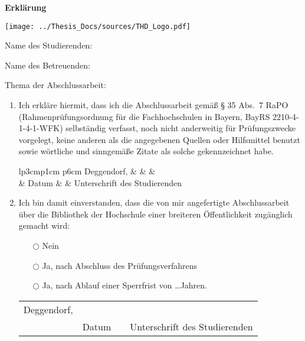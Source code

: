 \thispagestyle{empty}
\newcommand{\signature}[1]{%
\bigskip
\noindent
\begin{tabular*}{\linewidth}{lp{3cm}p{1cm} p{6cm}}
Deggendorf, & \dotfill & & \dotfill \\
& {\footnotesize Datum} & & {\centering \footnotesize #1}
\end{tabular*}
}

\begin{minipage}[b]{.5\linewidth}
	\Large\textbf{Erklärung}
\end{minipage}
\begin{minipage}[b]{.5\linewidth}
	\texttt{[image: ../Thesis\_Docs/sources/THD\_Logo.pdf]}
\end{minipage}

\bigskip

Name des Studierenden: \quad \student

\bigskip
Name des Betreuenden: \quad \supervisor

\vspace{.7cm}
Thema der Abschlussarbeit:

\vspace{.5em}
{\def\\{\relax\ifhmode\unskip\fi\space\ignorespaces}
\thesistitleDE
}\dotfill

\vspace{.5em}
\dotfill

\vspace{.5em}
\dotfill

\vspace{.5em}
\dotfill

\begin{enumerate}
	\item Ich erkläre hiermit, dass ich die Abschlussarbeit gemäß § 35 Abs.~7 RaPO (Rahmen\-prüf\-ungs\-ordnung für die Fachhochschulen in Bayern, BayRS 2210-4-1-4-1-WFK)  selbständig  verfasst,  noch  nicht  anderweitig  für Prüfungszwecke  vorgelegt,  keine  anderen  als  die  angegebenen  Quellen  oder Hilfsmittel  benutzt  sowie  wörtliche  und  sinngemäße  Zitate  als  solche gekenn\-zeichnet habe.

		\signature{Unterschrift des Studierenden}

	\item  Ich  bin  damit  einverstanden, dass die von  mir angefertigte  Abschlussarbeit über die Bibliothek der Hochschule einer breiteren Öffentlichkeit zugänglich gemacht wird:
		\begin{itemize}
			\item[$\bigcirc$] Nein
			\item[$\bigcirc$] Ja, nach Abschluss des Prüfungsverfahrens
			\item[$\bigcirc$] Ja, nach Ablauf einer Sperrfrist von \ldots Jahren.
		\end{itemize}

		\signature{Unterschrift des Studierenden}
\end{enumerate}

